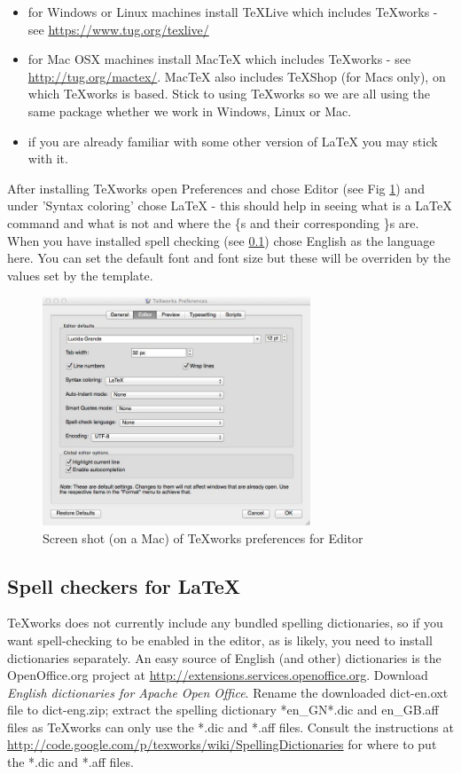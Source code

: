 \documentclass[twoside, fontsize=12pt,
     bibliography=totoc, %
     listof=totoc, %
     index=totoc, %
     onehalfspacing %
]{_MScDiss2017_cls}
\begin{document}
\begin{itemize}
\item for Windows or Linux machines install TeXLive which includes TeXworks - see \url{https://www.tug.org/texlive/} 
\item for Mac OSX machines install MacTeX which includes TeXworks - see \url{http://tug.org/mactex/}. MacTeX also includes TeXShop (for Macs only), on which TeXworks is based. Stick to using TeXworks so we are all using the same package whether we work in Windows, Linux or Mac.
\item if you are already familiar with some other version of LaTeX you may stick with it.
\end{itemize}

After installing TeXworks open Preferences and chose Editor (see Fig \ref{fig:texworks-prefs}) and under 'Syntax coloring' chose LaTeX - this should help in seeing what is a LaTeX command and what is not and where the \{s and their corresponding \}s are. When you have installed spell checking (see \ref{sec:spell}) chose English as the language here.
You can set the default font and font size but these will be overriden by the values set by the template.

\begin{figure}[hbtp]
  \begin{center}
  \includegraphics[width=80mm]{fig-texworks-preferences-editor.jpg}  %
  \caption{Screen shot (on a Mac) of TeXworks preferences for Editor} 
  \label{fig:texworks-prefs}
  \end{center}
\end{figure}

\subsection{Spell checkers for LaTeX}
\label{sec:spell}
TeXworks does not currently include any bundled spelling dictionaries, so if you want spell-checking to be enabled in the editor, as is likely, you need to install dictionaries separately. An easy source of English (and other) dictionaries is the OpenOffice.org project at \url{http://extensions.services.openoffice.org}. Download {\normalfont\itshape English dictionaries for Apache Open Office}. Rename the downloaded dict-en.oxt file to dict-eng.zip; extract the spelling dictionary *en\_GN*.dic and en\_GB.aff files as TeXworks can only use the *.dic and *.aff files. Consult the instructions at \url{http://code.google.com/p/texworks/wiki/SpellingDictionaries} for where to put the *.dic and *.aff files.
\end{document}
